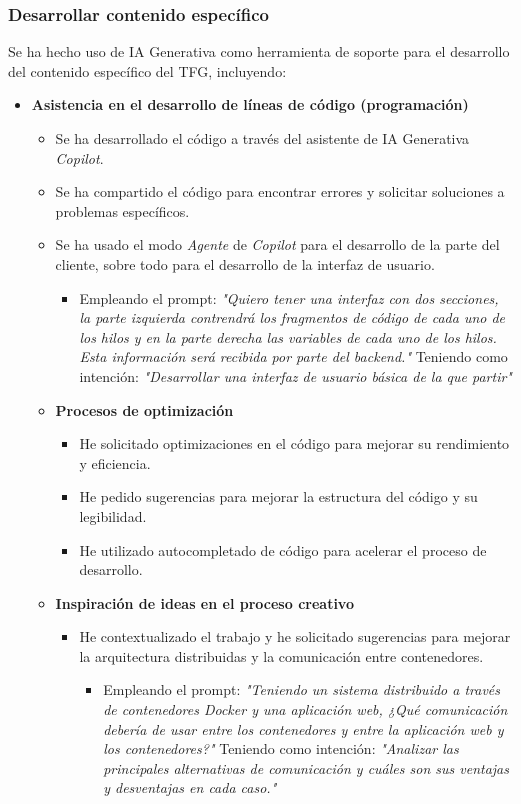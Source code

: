 \subsubsection*{Desarrollar contenido específico}
Se ha hecho uso de IA Generativa como herramienta de soporte para el desarrollo del contenido específico del TFG, incluyendo:
\begin{itemize}
    \item \textbf{Asistencia en el desarrollo de líneas de código (programación)} 
    \begin{itemize}
        \item Se ha desarrollado el código a través del asistente de IA Generativa \textit{Copilot}.
        \item Se ha compartido el código para encontrar errores y solicitar soluciones a problemas específicos.
        \item Se ha usado el modo \textit{Agente} de \textit{Copilot} para el desarrollo de la parte del cliente, sobre todo para el desarrollo de la interfaz de usuario.
        \begin{itemize}
            \item Empleando el prompt: \textit{"Quiero tener una interfaz con dos secciones, la parte izquierda contrendrá los fragmentos de código de cada uno de los hilos y en la parte derecha las variables de cada uno de los hilos. Esta información será recibida por parte del backend."} Teniendo como intención: \textit{"Desarrollar una interfaz de usuario básica de la que partir"}
    \end{itemize}
    \item \textbf{Procesos de optimización} 
    \begin{itemize}
        \item He solicitado optimizaciones en el código para mejorar su rendimiento y eficiencia.
        \item He pedido sugerencias para mejorar la estructura del código y su legibilidad.
        \item He utilizado autocompletado de código para acelerar el proceso de desarrollo. 
    \end{itemize}
    \item \textbf{Inspiración de ideas en el proceso creativo} 
    \begin{itemize}
        \item He contextualizado el trabajo y he solicitado sugerencias para mejorar la arquitectura distribuidas y la comunicación entre contenedores.
        \begin{itemize}
            \item Empleando el prompt: \textit{"Teniendo un sistema distribuido a través de contenedores Docker y una aplicación web, ¿Qué comunicación debería de usar entre los contenedores y entre la aplicación web y los contenedores?"} Teniendo como intención: \textit{"Analizar las principales alternativas de comunicación y cuáles son sus ventajas y desventajas en cada caso."}
        \end{itemize}
    \end{itemize}
    \end{itemize}

\end{itemize} 

